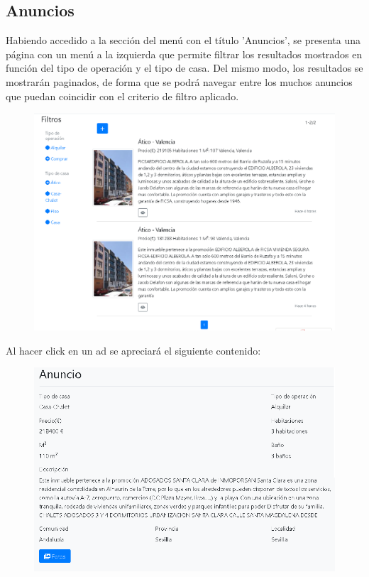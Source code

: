 \subsection{Anuncios}
Habiendo accedido a la secci\'{o}n del men\'{u} con el t\'{i}tulo 'Anuncios', se presenta una p\'{a}gina con un men\'{u} a la izquierda que permite filtrar los resultados mostrados en funci\'{o}n del tipo de operaci\'{o}n y el tipo de casa. Del mismo modo, los resultados se mostrar\'{a}n paginados, de forma que se podr\'{a} navegar entre los muchos anuncios que puedan coincidir con el criterio de filtro aplicado.

\begin{figure}[h!]
\centering
\includegraphics[width=.7\textwidth]{Img/ManualUsuario/LISTADO_ANUNCIOS.png}
\end{figure}


Al hacer click en un ad se apreciar\'{a} el siguiente contenido:

\begin{figure}[h!]
\centering
\includegraphics[width=.9\textwidth, height=.5\textheight]{Img/ManualUsuario/ANUNCIO_GUEST.png}
\end{figure}


